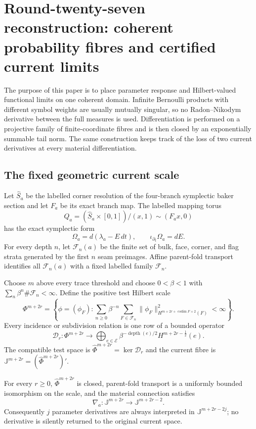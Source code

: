 \section{Round-twenty-seven reconstruction: coherent probability fibres and certified current limits}
\label{sec:r27-a1}

The purpose of this paper is to place parameter response and Hilbert-valued
functional limits on one coherent domain.  Infinite Bernoulli products with
different symbol weights are usually mutually singular, so no Radon--Nikodym
derivative between the full measures is used.  Differentiation is performed
on a projective family of finite-coordinate fibres and is then closed by an
exponentially summable tail norm.  The same construction keeps track of the
loss of two current derivatives at every material differentiation.

\subsection{The fixed geometric current scale}

Let $\widehat S_a$ be the labelled corner resolution of the four-branch
symplectic baker section and let $F_a$ be its exact branch map.  The labelled
mapping torus
\[
 Q_a=(\widehat S_a\times[0,1])/(x,1)\sim(F_ax,0)
\]
has the exact symplectic form
\[
 \Omega_a=d(\lambda_a-E\,dt),
 \qquad \iota_{\partial_t}\Omega_a=dE.
\]
For every depth $n$, let $\mathscr F_n(a)$ be the finite set of bulk, face,
corner, and flag strata generated by the first $n$ seam preimages.  Affine
parent-fold transport identifies all $\mathscr F_n(a)$ with a fixed labelled
family $\mathscr F_n$.

Choose $m$ above every trace threshold and choose $0<\beta<1$ with
$\sum_n\beta^n\#\mathscr F_n<\infty$.  Define the positive test Hilbert scale
\[
 \Phi^{m+2r}
 =\left\{\phi=(\phi_F):
 \sum_{n\ge0}\beta^{-n}\sum_{F\in\mathscr F_n}
 \|\phi_F\|_{H^{m+2r+\operatorname{codim}F+2}(F)}^2<\infty\right\}.
\]
Every incidence or subdivision relation is one row of a bounded operator
\[
 \mathcal D_r:\Phi^{m+2r}\longrightarrow
 \bigoplus_{e\in\mathscr E}\beta^{-\operatorname{depth}(e)/2}
 H^{m+2r-\frac12}(e).
\]
The compatible test space is $\widehat\Phi^{m+2r}=\ker\mathcal D_r$ and the
current fibre is $\mathbb J^{m+2r}=(\widehat\Phi^{m+2r})'$.

\begin{lemma}
\label{lem:r27-a1-closed}
For every $r\ge0$, $\widehat\Phi^{m+2r}$ is closed, parent-fold transport is a
uniformly bounded isomorphism on the scale, and the material connection
satisfies
\[
 \nabla_a:\mathbb J^{m+2r}\longrightarrow\mathbb J^{m+2r-2}.
\]
Consequently $j$ parameter derivatives are always interpreted in
$\mathbb J^{m+2r-2j}$; no derivative is silently returned to the original
current space.
\end{lemma}

